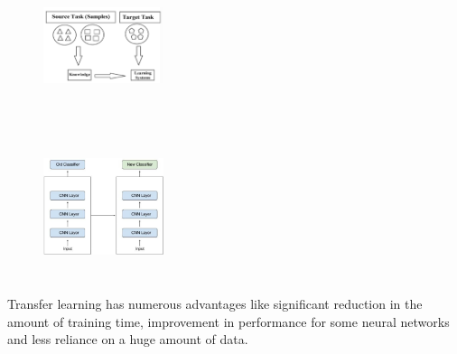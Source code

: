 \begin{figure}
  \centering
  \begin{minipage}[t]{.45\textwidth}
    \centering
    \includegraphics[width=100pt,height=120pt]{pictures/source_target.PNG}
    \label{fig:source_target}
  \end{minipage}%
  \hspace{1cm}
  \begin{minipage}[t]{.45\textwidth}
    \centering
    \includegraphics[width=100pt,height=120pt]{pictures/transfer_learning.PNG}
    \label{fig:transfer_learning}
  \end{minipage}  
\end{figure}
Transfer learning has numerous advantages like significant reduction in the amount of training time\cite{liu2019exploring}, improvement in performance for some neural networks\cite{pan2011transfer} and less reliance on a huge amount of data\cite{duan2012learning,kulis2011you,zhu2011heterogeneous}.  
